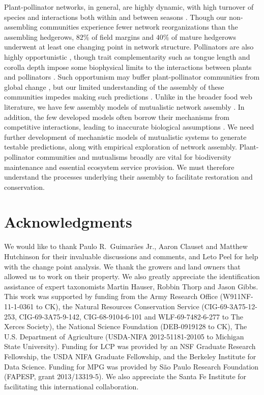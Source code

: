 \documentclass[12pt]{article}
\begin{document}
Plant-pollinator networks, in general, are highly dynamic, with high
turnover of species and interactions both within and between seasons
\citep{Burkle2011}. Though our non-assembling communities experience
fewer network reorganizations than the assembling hedgerows, $82\%$ of
field margins and $40\%$ of mature hedgerows underwent at least one
changing point in network structure. Pollinators are also highly
opportunistic \citep{petanidou-2008-564, Vazquez2005b,
  albrecht2010plant}, though trait complementarity such as tongue
length and corolla depth impose some biophysical limits to the
interactions between plants and pollinators
\citep{Vazquez2009evaluating, Vazquez2009, Stang2009, Stang2006,
  Santamaria2007}. Such opportunism may buffer plant-pollinator
communities from global change \citep[e.g.,][]{ramos2012topological,
  kaiser2010robustness}, but our limited understanding of the assembly
of these communities impedes making such predictions
\citep{Vazquez2009, Burkle2011}. Unlike in the broader food web
literature, we have few assembly models of mutualistic network
assembly \citep{valdovinos2013adaptive, Nuismer2013, Guimaraes2011}.
In addition, the few developed models often borrow their mechanisms
from competitive interactions, leading to inaccurate biological
assumptions \citep{holland2006comment}. We need further development of
mechanistic models of mutualistic systems to generate testable
predictions, along with empirical exploration of network
assembly. Plant-pollinator communities and mutualisms broadly are
vital for biodiversity maintenance and essential ecosystem service
provision. We must therefore understand the processes underlying their
assembly to facilitate restoration and conservation.

\section*{Acknowledgments}
\label{sec:acknowledge}

We would like to thank Paulo R.~Guimar{\~a}es Jr., Aaron Clauset and
Matthew Hutchinson for their invaluable discussions and comments, and
Leto Peel for help with the change point analysis.  We thank the
growers and land owners that allowed us to work on their property. We
also greatly appreciate the identification assistance of expert
taxonomists Martin Hauser, Robbin Thorp and Jason Gibbs.  This work
was supported by funding from the Army Research Office
(W911NF-11-1-0361 to CK), the Natural Resources Conservation Service
(CIG-69-3A75-12-253, CIG-69-3A75-9-142, CIG-68-9104-6-101 and
WLF-69-7482-6-277 to The Xerces Society), the National Science
Foundation (DEB-0919128 to CK), The U.S.  Department of Agriculture
(USDA-NIFA 2012-51181-20105 to Michigan State University).  Funding
for LCP was provided by an NSF Graduate Research Fellowship, the USDA
NIFA Graduate Fellowship, and the Berkeley Institute for Data
Science. Funding for MPG was provided by S{\~a}o Paulo Research
Foundation (FAPESP, grant 2013/13319-5). We also appreciate the Santa
Fe Institute for facilitating this international collaboration.
\end{document}
